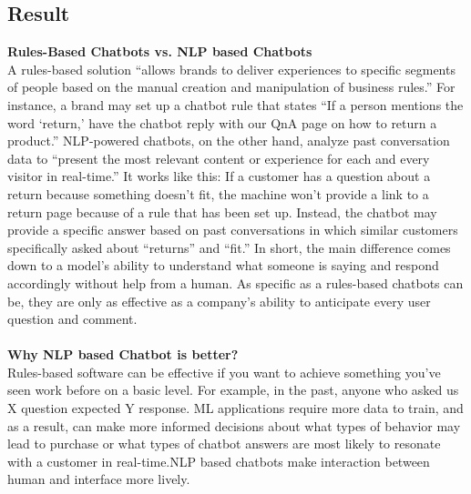 \documentclass[12pt,a4paper]{report}     %
\begin{document}
\begin{normalsize}
{{\section{Result }
{\large \bf Rules-Based Chatbots vs. NLP based Chatbots} \\
\-\hspace{1cm}A rules-based solution “allows brands to deliver experiences to specific segments of people based on the manual creation and manipulation of business rules.” For instance, a brand may set up a chatbot rule that states “If a person mentions the word ‘return,’ have the chatbot reply with our QnA page on how to return a product.” NLP-powered chatbots, on the other hand, analyze past conversation data to “present the most relevant content or experience for each and every visitor in real-time.” It works like this: If a customer has a question about a return because something doesn’t fit, the machine won’t provide a link to a return page because of a rule that has been set up. Instead, the chatbot may provide a specific answer based on past conversations in which similar customers specifically asked about “returns” and “fit.” In short, the main difference comes down to a model’s ability to understand what someone is saying and respond accordingly without help from a human. As specific as a rules-based chatbots can be, they are only as effective as a company’s ability to anticipate every user question and comment. \\ \\
{\large \bf Why NLP based Chatbot is better?} \\
\-\hspace{1cm}Rules-based software can be effective if you want to achieve something you’ve seen work before on a basic level. For example, in the past, anyone who asked us X question expected Y response. ML applications require more data to train, and as a result, can make more informed decisions about what types of behavior may lead to purchase or what types of chatbot answers are most likely to resonate with a customer in real-time.NLP based chatbots make interaction between human and interface more lively.
}
\newpage 
\chapter{}
{\setlength{\baselineskip}{1.1\baselineskip}
}}
\end{normalsize}
\end{document}
